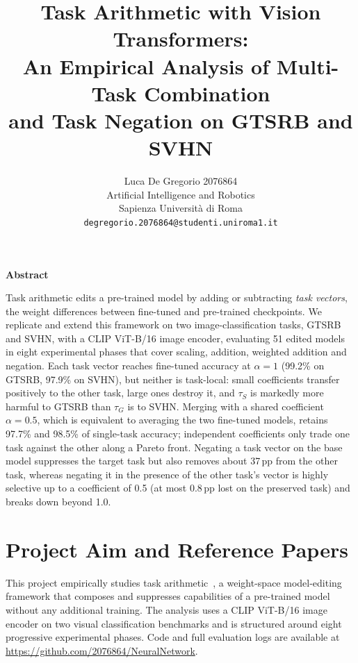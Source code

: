 \documentclass[11pt,a4paper,twocolumn]{article}
\title{\Large\bfseries Task Arithmetic with Vision Transformers:\\
An Empirical Analysis of Multi-Task Combination\\
and Task Negation on GTSRB and SVHN}
\author{Luca De Gregorio 2076864\\
Artificial Intelligence and Robotics\\
Sapienza Università di Roma\\
\texttt{degregorio.2076864@studenti.uniroma1.it}}
\date{}
\newcommand{\tG}{\tau_G}
\newcommand{\tS}{\tau_S}
\newcommand{\pp}{\,pp}
\begin{document}
\maketitle

\begin{center}\textbf{Abstract}\end{center}
\vspace{-0.6ex}
{\small\leftskip=0.6cm\rightskip=0.6cm\noindent
Task arithmetic edits a pre-trained model by adding or subtracting
\emph{task vectors}, the weight differences between fine-tuned and
pre-trained checkpoints. We replicate and extend this framework on two
image-classification tasks, GTSRB and SVHN, with a CLIP ViT-B/16 image
encoder, evaluating 51 edited models in eight experimental phases that
cover scaling, addition, weighted addition and negation. Each task vector
reaches fine-tuned accuracy at $\alpha=1$ (99.2\% on GTSRB, 97.9\% on
SVHN), but neither is task-local: small coefficients transfer positively
to the other task, large ones destroy it, and $\tS$ is markedly more
harmful to GTSRB than $\tG$ is to SVHN. Merging with a shared coefficient
$\alpha=0.5$, which is equivalent to averaging the two fine-tuned models,
retains 97.7\% and 98.5\% of single-task accuracy; independent
coefficients only trade one task against the other along a Pareto front.
Negating a task vector on the base model suppresses the target task but
also removes about 37\pp{} from the other task, whereas negating it in the
presence of the other task's vector is highly selective up to a
coefficient of 0.5 (at most 0.8\pp{} lost on the preserved task) and breaks
down beyond 1.0.\par}

\section{Project Aim and Reference Papers}

This project empirically studies task arithmetic~\citep{ilharco2023}, a
weight-space model-editing framework that composes and suppresses
capabilities of a pre-trained model without any additional training. The
analysis uses a CLIP ViT-B/16 image encoder on two visual classification
benchmarks and is structured around eight progressive experimental phases.
Code and full evaluation logs are available at
\url{https://github.com/2076864/NeuralNetwork}.

\end{document}

